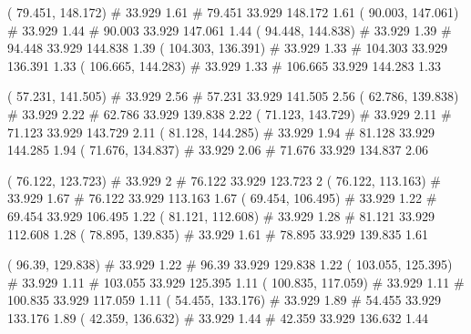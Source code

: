 \documentclass[a4paper,openbib,10pt]{article}
\newenvironment{treegraph}{\begin{graph}}{\end{graph}}
\begin{document}
\begin{treegraph}
  ( 79.451, 148.172) #     33.929    1.61
   #    79.451    33.929    148.172    1.61
  ( 90.003, 147.061) #     33.929    1.44
   #    90.003    33.929    147.061    1.44
  ( 94.448, 144.838) #     33.929    1.39
   #    94.448    33.929    144.838    1.39
  ( 104.303, 136.391) #     33.929    1.33
   #    104.303    33.929    136.391    1.33
  ( 106.665, 144.283) #     33.929    1.33
   #    106.665    33.929    144.283    1.33

  ( 57.231, 141.505) #     33.929    2.56
   #    57.231    33.929    141.505    2.56
  ( 62.786, 139.838) #     33.929    2.22
   #    62.786    33.929    139.838    2.22
  ( 71.123, 143.729) #     33.929    2.11
   #    71.123    33.929    143.729    2.11
  ( 81.128, 144.285) #     33.929    1.94
   #    81.128    33.929    144.285    1.94
  ( 71.676, 134.837) #     33.929    2.06
   #    71.676    33.929    134.837    2.06

  ( 76.122, 123.723) #     33.929    2
   #    76.122    33.929    123.723    2
  ( 76.122, 113.163) #     33.929    1.67
   #    76.122    33.929    113.163    1.67
  ( 69.454, 106.495) #     33.929    1.22
   #    69.454    33.929    106.495    1.22
  ( 81.121, 112.608) #     33.929    1.28
   #    81.121    33.929    112.608    1.28
  ( 78.895, 139.835) #     33.929    1.61
   #    78.895    33.929    139.835    1.61

  ( 96.39, 129.838) #     33.929    1.22
   #    96.39    33.929    129.838    1.22
  ( 103.055, 125.395) #     33.929    1.11
   #    103.055    33.929    125.395    1.11
  ( 100.835, 117.059) #     33.929    1.11
   #    100.835    33.929    117.059    1.11
  ( 54.455, 133.176) #     33.929    1.89
   #    54.455    33.929    133.176    1.89
  ( 42.359, 136.632) #     33.929    1.44
   #    42.359    33.929    136.632    1.44


\end{treegraph}
\end{document}
